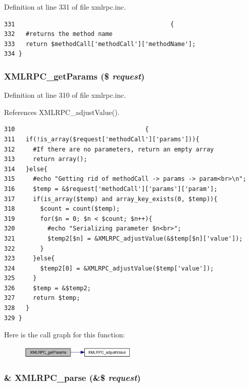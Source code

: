 Definition at line 331 of file xmlrpc.inc.

\begin{Code}\begin{verbatim}331                                           {
332   #returns the method name
333   return $methodCall['methodCall']['methodName'];
334 }
\end{verbatim}
\end{Code}


\hypertarget{xmlrpc_8inc_ce4ea8e1274ca2ee3f51ec5a724f00f3}{
\subsubsection{\setlength{\rightskip}{0pt plus 5cm}XMLRPC\_\-getParams (\$ {\em request})}}
\label{xmlrpc_8inc_ce4ea8e1274ca2ee3f51ec5a724f00f3}




Definition at line 310 of file xmlrpc.inc.

References XMLRPC\_\-adjustValue().

\begin{Code}\begin{verbatim}310                                    {
311   if(!is_array($request['methodCall']['params'])){
312     #If there are no parameters, return an empty array
313     return array();
314   }else{
315     #echo "Getting rid of methodCall -> params -> param<br>\n";
316     $temp = &$request['methodCall']['params']['param'];
317     if(is_array($temp) and array_key_exists(0, $temp)){
318       $count = count($temp);
319       for($n = 0; $n < $count; $n++){
320         #echo "Serializing parameter $n<br>";
321         $temp2[$n] = &XMLRPC_adjustValue(&$temp[$n]['value']);
322       }
323     }else{
324       $temp2[0] = &XMLRPC_adjustValue($temp['value']);
325     }
326     $temp = &$temp2;
327     return $temp;
328   }
329 }
\end{verbatim}
\end{Code}




Here is the call graph for this function:\nopagebreak
\begin{figure}[H]
\begin{center}
\leavevmode
\includegraphics[width=159pt]{xmlrpc_8inc_ce4ea8e1274ca2ee3f51ec5a724f00f3_cgraph}
\end{center}
\end{figure}
\hypertarget{xmlrpc_8inc_708b2136ca600664d2207a511b3cf3f8}{
\subsubsection{\setlength{\rightskip}{0pt plus 5cm}\& XMLRPC\_\-parse (\&\$ {\em request})}}
\label{xmlrpc_8inc_708b2136ca600664d2207a511b3cf3f8}




